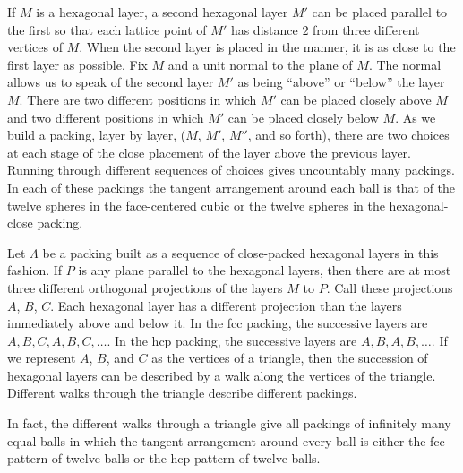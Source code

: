 If $M$ is a hexagonal layer, a second hexagonal layer $M'$ can be
placed parallel to the first so that each lattice point of $M'$ has
distance $2$ from three different vertices of $M$.  When the second
layer is placed in the manner, it is as close to the first layer as
possible. Fix $M$ and a unit normal to the plane of $M$. The normal
allows us to speak of the second layer $M'$ as being ``above'' or
``below'' the layer $M$. There are two different positions in which
$M'$ can be placed closely above $M$ and two different positions in
which $M'$ can be placed closely below $M$. As we build a packing,
layer by layer, ($M$, $M'$, $M''$, and so forth), there are two
choices at each stage of the close placement of the layer above the
previous layer. Running through different sequences of choices gives
uncountably many packings.  In each of these packings the tangent
arrangement around each ball is that of the twelve spheres in the
face-centered cubic or the twelve spheres in the hexagonal-close
packing.

Let $\Lambda$ be a packing built as a sequence of close-packed
hexagonal layers in this fashion.  If $P$ is any plane parallel to
the hexagonal layers, then there are at most three different
orthogonal projections of the layers $M$ to $P$.  Call these
projections $A$, $B$, $C$.  Each hexagonal layer has a different
projection than the layers immediately above and below it.  In the
fcc packing, the successive layers are $A,B,C,A,B,C,\ldots$.  In
the hcp packing, the successive layers are $A,B,A,B,\ldots$.  If
we represent $A$, $B$, and $C$ as the vertices of a triangle, then
the succession of hexagonal layers can be described by a walk
along the vertices of the triangle. Different walks through the
triangle describe different packings.


In fact, the different walks through a triangle give all packings of
infinitely many equal balls in which the tangent arrangement around
every ball is either the fcc pattern of twelve balls or the hcp
pattern of twelve balls.

\bigskip


